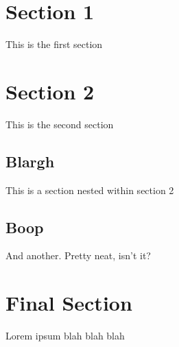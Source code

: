 \section{Section 1}
\par This is the first section
\section{Section 2}
\par This is the second section
\subsection{Blargh}
\par This is a section nested within section 2
\subsection{Boop}
\par And another.  Pretty neat, isn't it?
\section{Final Section}
\par Lorem ipsum blah blah blah
